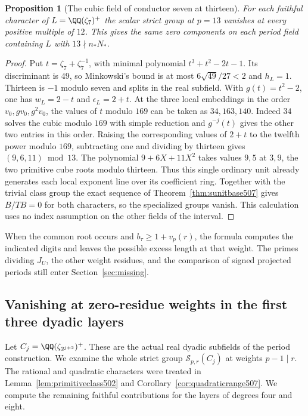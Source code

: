 \documentclass[a4paper,11pt]{article}
\newtheorem{proposition}{Proposition}[section]
\theoremstyle{definition}
\theoremstyle{remark}
\numberwithin{equation}{section}
\begin{document}
\begin{proposition}[The cubic field of conductor seven at thirteen]
\leavevmode\label{prop:cubicunit523}
For each faithful character of \(L=\QQ(\zeta_7)^+\) the scalar
strict group at \(p=13\) vanishes at every positive multiple of
\(12\). This gives the same zero components on each period field
containing \(L\) with \(13\nmid n_*N_*\).
\end{proposition}
\begin{proof}
Put \(t=\zeta_7+\zeta_7^{-1}\), with minimal polynomial
\(t^3+t^2-2t-1\). Its discriminant is \(49\), so Minkowski's bound
is at most \(6\sqrt{49}/27<2\) and \(h_L=1\). Thirteen is \(-1\)
modulo seven and splits in the real subfield. With \(g(t)=t^2-2\),
one has \(w_L=2-t\) and \(\epsilon_L=2+t\). At the three local
embeddings in the order \(v_0,gv_0,g^2v_0\), the values of \(t\)
modulo \(169\) can be taken as \(34,163,140\). Indeed \(34\) solves
the cubic modulo \(169\) with simple reduction and \(g^{-j}(t)\)
gives the other two entries in this order. Raising the corresponding
values of \(2+t\) to the twelfth power modulo \(169\), subtracting
one and dividing by thirteen gives \((9,6,11)\bmod13\). The
polynomial \(9+6X+11X^2\) takes values \(9,5\) at \(3,9\), the two
primitive cube roots modulo thirteen. Thus this single ordinary unit
already generates each local exponent line over its coefficient
ring. Together with the trivial class group the exact sequence of
Theorem~\ref{thm:sunitbase507} gives \(B/TB=0\) for both characters,
so the specialized groups vanish. This calculation uses no index
assumption on the other fields of the interval.
\end{proof}

When the common root occurs and \(b_\tau\ge1+v_p(r)\), the formula
computes the indicated digits and leaves the possible excess length
at that weight. The primes dividing \(J_U\), the other weight
residues, and the comparison of signed projected periods still enter
Section~\ref{sec:missing}.


\subsection{Vanishing at zero-residue weights in the first three dyadic layers}
\label{sec:dyadicunits524}

Let \(C_j=\QQ(\zeta_{2^{j+2}})^+\). These are the actual real dyadic
subfields of the period construction. We examine the whole strict
group \(\mathcal S_{p,r}(C_j)\) at weights \(p-1\mid r\). The rational
and quadratic characters were treated in Lemma~\ref{lem:primitiveclass502}
and Corollary~\ref{cor:quadraticrange507}. We compute the remaining
faithful contributions for the layers of degrees four and eight.
\end{document}
